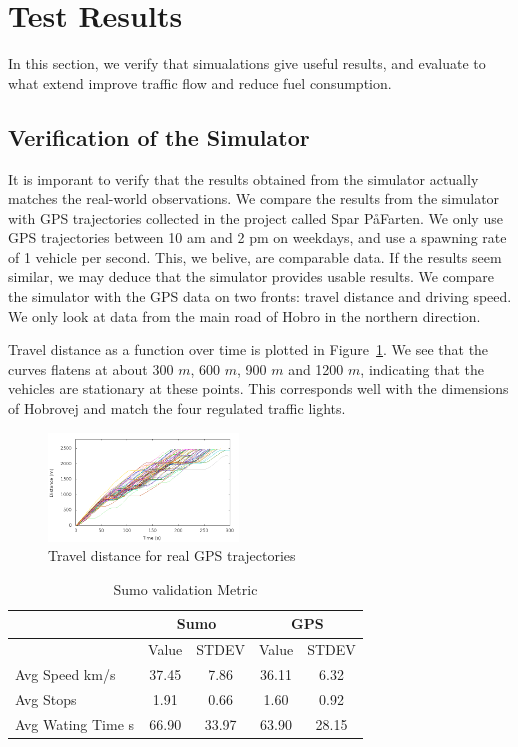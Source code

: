 \section{Test Results}\label{sec:Test}
In this section, we verify that simualations give useful results, and evaluate to what extend \tech improve traffic flow and reduce fuel consumption.

\subsection{Verification of the Simulator}
It is imporant to verify that the results obtained from the simulator actually matches the real-world observations.
We compare the results from the simulator with GPS trajectories collected in the project called Spar P\aa Farten.
We only use GPS trajectories between 10 am and 2 pm on weekdays, and use a spawning rate of 1 vehicle per second.
This, we belive, are comparable data.
If the results seem similar, we may deduce that the simulator provides usable results.
We compare the simulator with the GPS data on two fronts: travel distance and driving speed.
We only look at data from the main road of Hobro in the northern direction.

Travel distance as a function over time is plotted in Figure~\ref{fig:TestResults:realDistance}. 
We see that the curves flatens at about 300 $m$, 600 $m$, 900 $m$ and 1200 $m$, indicating that the vehicles are stationary at these points.
This corresponds well with the dimensions of Hobrovej and match the four regulated traffic lights.
\begin{figure}[htb]
\includegraphics[width=0.45\textwidth]{../images/Real/RealDistance.png}
\caption{Travel distance for real GPS trajectories}
\label{fig:TestResults:realDistance}
\end{figure}

\begin{table}
\centering
\begin{tabular}{|l|c|c|c|c|}\hline
 &  \multicolumn{2}{c|}{Sumo} & \multicolumn{2}{c|}{GPS} \\\hline
 & Value & STDEV & Value & STDEV \\\hline
Avg Speed km/s & 37.45 & 7.86 & 36.11 & 6.32 \\\hline
Avg Stops & 1.91 & 0.66 & 1.60 & 0.92 \\\hline
Avg Wating Time s & 66.90 & 33.97 & 63.90 & 28.15 \\\hline
\end{tabular}
\caption{Sumo validation Metric}\label{table.vehicleTypes}
\end{table}




